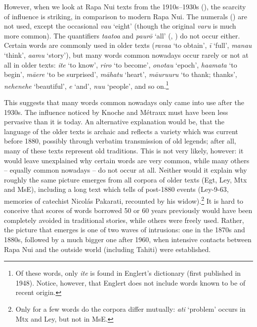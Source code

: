 However, when we look at Rapa Nui texts from the 1910s–1930s (), the scarcity of  influence is striking, in comparison to modern Rapa Nui. The  numerals () are not used, except the occasional \textit{va{\ꞌ}u} ‘eight’ (though the original \textit{varu} is much more common). The  quantifiers \textit{ta{\ꞌ}ato{\ꞌ}a} and \textit{paurō} ‘all’ (, ) do not occur either. Certain  words are commonly used in older texts (\textit{\mbox{rava{\ꞌ}a}} ‘to obtain’, \textit{{\ꞌ}ī} ‘full’, \textit{mana{\ꞌ}u} ‘think’, \textit{\mbox{{\ꞌ}a{\ꞌ}amu}} ‘story’), but many words common nowadays occur rarely or not at all in older texts: \textit{{\ꞌ}ite} ‘to know’, \textit{riro} ‘to become’, \textit{{\ꞌ}onotau} ‘epoch’, \textit{ha{\ꞌ}amata} ‘to begin’, \textit{māere} ‘to be surprised’, \textit{māhatu} ‘heart’, \textit{māuruuru} ‘to thank; thanks’, \textit{nehenehe} ‘beautiful’, \textit{{\ꞌ}e} ‘and’, \textit{\mbox{nu{\ꞌ}u}} ‘people’, and so on.\footnote{\label{fn:18}Of these words, only \textit{{\ꞌ}ite} is found in Englert’s dictionary (first published in 1948). Notice, however, that Englert does not include words known to be of recent origin.} 

\largerpage
This suggests that many  words common nowadays only came into use after the 1930s. The  influence noticed by Knoche and Métraux must have been less pervasive than it is today. An alternative explanation would be, that the language of the older texts is archaic and reflects a variety which was current before 1880, possibly through verbatim transmission of old legends; after all, many of these texts represent old traditions. This is not very likely, however: it would leave unexplained why certain  words are very common, while many others – equally common nowadays – do not occur at all. Neither would it explain why roughly the same picture emerges from all corpora of older texts (Egt, Ley, Mtx and MsE), including a long text which tells of post-1880 events (Ley-9-63, memories of catechist Nicolás Pakarati, recounted by his widow).\footnote{\label{fn:19}Only for a few words do the corpora differ mutually: \textit{{\ꞌ}ati} ‘problem’ occurs in Mtx and Ley, but not in MsE.} It is hard to conceive that scores of words borrowed 50 or 60 years previously would have been completely avoided in traditional stories, while others were freely used. Rather, the picture that emerges is one of two waves of  intrusions: one in the 1870s and 1880s, followed by a much bigger one after 1960, when intensive contacts between Rapa Nui and the outside world (including Tahiti) were established.
